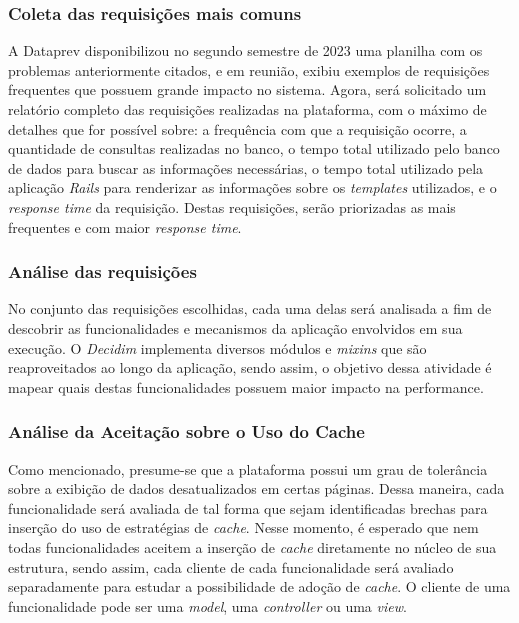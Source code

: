 \subsubsection{Coleta das requisições mais comuns}

A Dataprev disponibilizou no segundo semestre de 2023 uma planilha com os problemas anteriormente citados, e em reunião, exibiu exemplos de requisições frequentes que possuem grande impacto no sistema. Agora, será solicitado um relatório completo das requisições realizadas na plataforma, com o máximo de detalhes que for possível sobre: a frequência com que a requisição ocorre, a quantidade de consultas realizadas no banco, o tempo total utilizado pelo banco de dados para buscar as informações necessárias, o tempo total utilizado pela aplicação \textit{Rails} para renderizar as informações sobre os \textit{templates} utilizados, e o \textit{response time} da requisição. Destas requisições, serão priorizadas as mais frequentes e com maior \textit{response time}.

\subsubsection{Análise das requisições}

No conjunto das requisições escolhidas, cada uma delas será analisada a fim de descobrir as funcionalidades e mecanismos da aplicação envolvidos em sua execução. O \textit{Decidim} implementa diversos módulos e \textit{mixins} que são reaproveitados ao longo da aplicação, sendo assim, o objetivo dessa atividade é mapear quais destas funcionalidades possuem maior impacto na performance.

\subsubsection{Análise da Aceitação sobre o Uso do Cache}

Como mencionado, presume-se que a plataforma possui um grau de tolerância sobre a exibição de dados desatualizados em certas páginas. Dessa maneira, cada funcionalidade será avaliada de tal forma que sejam identificadas brechas para inserção do uso de estratégias de \textit{cache}. Nesse momento, é esperado que nem todas funcionalidades aceitem a inserção de \textit{cache} diretamente no núcleo de sua estrutura, sendo assim, cada cliente de cada funcionalidade será avaliado separadamente para estudar a possibilidade de adoção de \textit{cache}. O cliente de uma funcionalidade pode ser uma \textit{model}, uma \textit{controller} ou uma \textit{view}.

